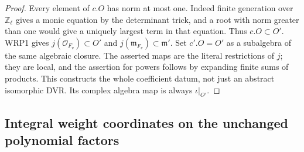 \begin{proof}
Every element of $c.O$ has norm at most one.  Indeed finite
generation over $\mathbb Z_\ell$ gives a monic equation by
the determinant trick, and a root with norm greater than one
would give a uniquely largest term in that equation.  Thus
$c.O\subset O'$.  WRP1 gives $j(\mathcal O_{F_v})\subset O'$
and $j(\mathfrak m_{F_v})\subset\mathfrak m'$.  Set
$c'.O=O'$ as a subalgebra of the same algebraic closure.
The asserted maps are the literal restrictions of $j$;
they are local, and the assertion for powers follows by
expanding finite sums of products.  This constructs the
whole coefficient datum, not just an abstract isomorphic
DVR.  Its complex algebra map is always $\iota|_{O'}$.
\end{proof}

\subsection{Integral weight coordinates on the unchanged polynomial factors}

